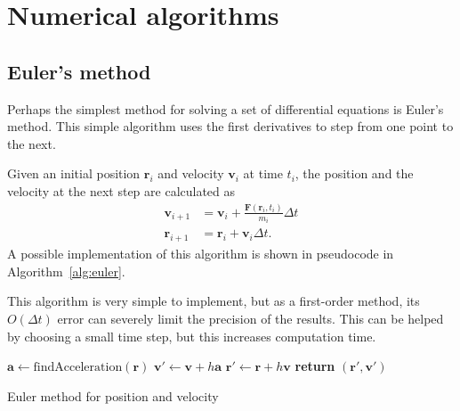 \documentclass[aps,prc,reprint]{revtex4-1}
\begin{document}
\section{Numerical algorithms}
\label{sec:algorithms}

    \subsection{Euler's method}
    \label{sub:euler}

        Perhaps the simplest method for solving a set of differential equations is Euler's method. This simple algorithm uses the first derivatives to step from one point to the next.

        Given an initial position $\mathbf{r}_i$ and velocity $\mathbf{v}_i$ at time $t_i$, the position and the velocity at the next step are calculated as \cite{Hjorth-Jensen2016}
        \begin{align}
            \mathbf{v}_{i+1} &= \mathbf{v}_i + \frac{\mathbf{F}(\mathbf{r}_i, t_i)}{m_i} \Delta t \\
            \mathbf{r}_{i+1} &= \mathbf{r}_i + \mathbf{v}_i \Delta t.
        \end{align}
        A possible implementation of this algorithm is shown in pseudocode in Algorithm~\ref{alg:euler}.

        This algorithm is very simple to implement, but as a first-order method, its $O(\Delta t)$ error can severely limit the precision of the results. This can be helped by choosing a small time step, but this increases computation time.

            \begin{algorithm}[H]
                \begin{algorithmic}
                        \State $\mathbf{a} \gets \text{findAcceleration}(\mathbf{r})$
                        \State $\mathbf{v}' \gets \mathbf{v} + h \mathbf{a}$
                        \State $\mathbf{r}' \gets \mathbf{r} + h \mathbf{v}$
                        \State \textbf{return} $(\mathbf{r}', \mathbf{v}')$
                    \EndFunction
                \end{algorithmic}
                \caption{Euler method for position and velocity}
                \label{alg:euler}
            \end{algorithm}
\end{document}
